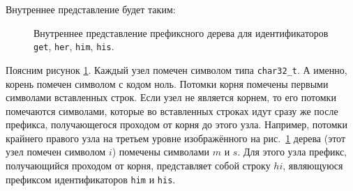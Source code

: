 \documentclass[10pt]{report}
\begin{document}
Внутреннее представление будет таким:
\begin{figure}[!h]
\centering
{}
\caption{Внутреннее представление префиксного дерева для идентификаторов \texttt{get}, \texttt{her}, \texttt{him}, \texttt{his}.}\label{inner.repres.for.ids.get.her.him.his}
\end{figure}

Поясним рисунок \ref{inner.repres.for.ids.get.her.him.his}. Каждый узел помечен символом типа \texttt{char32_t}. А именно, корень помечен символом с кодом ноль. Потомки корня помечены первыми символами вставленных строк. Если узел не является корнем, то его потомки помечаются символами, которые во вставленных строках идут сразу же после префикса, получающегося проходом от корня до этого узла. Например, потомки крайнего правого узла на третьем уровне изображённого на
рис.~\ref{inner.repres.for.ids.get.her.him.his} дерева (этот узел помечен символом $i$) помечены символами $m$ и $s$. Для этого узла префикс, получающийся проходом от корня, представляет собой строку $hi$, являющуюся префиксом идентификаторов \texttt{him} и \texttt{his}. 
\end{document}
